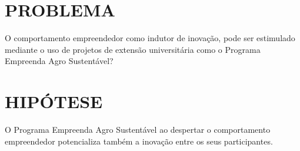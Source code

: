 \section{PROBLEMA}

O comportamento empreendedor como indutor de inovação, pode ser estimulado mediante o uso de projetos de extensão universitária como o Programa Empreenda Agro Sustentável? 


\section{HIPÓTESE}

O Programa Empreenda Agro Sustentável ao despertar o comportamento empreendedor potencializa também a inovação entre os seus participantes.









